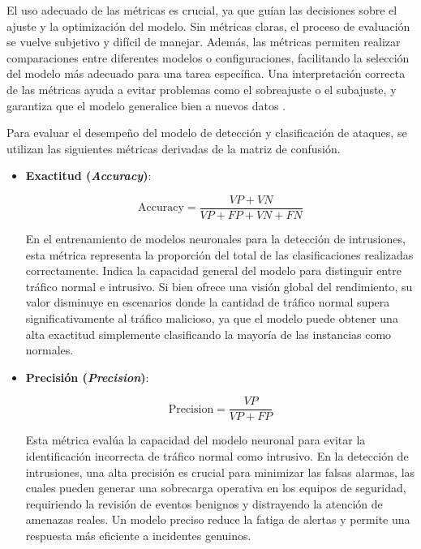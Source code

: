 El uso adecuado de las métricas es crucial, ya que guían las decisiones sobre el ajuste y la optimización del modelo. Sin métricas claras, el proceso de evaluación se vuelve subjetivo y difícil de manejar. Además, las métricas permiten realizar comparaciones entre diferentes modelos o configuraciones, facilitando la selección del modelo más adecuado para una tarea específica. Una interpretación correcta de las métricas ayuda a evitar problemas como el sobreajuste o el subajuste, y garantiza que el modelo generalice bien a nuevos datos \cite{goodfellow2016deep}.

Para evaluar el desempeño del modelo de detección y clasificación de ataques, se utilizan las siguientes métricas derivadas de la matriz de confusión.


\begin{itemize}
    \item \textbf{Exactitud (\textit{Accuracy})}: \label{met:Accuracy}
    
\begin{equation}
    \text{Accuracy} = \frac{VP + VN}{VP + FP + VN + FN}
\end{equation}

En el entrenamiento de modelos neuronales para la detección de intrusiones, esta métrica representa la proporción del total de las clasificaciones realizadas correctamente. Indica la capacidad general del modelo para distinguir entre tráfico normal e intrusivo. Si bien ofrece una visión global del rendimiento, su valor disminuye en escenarios donde la cantidad de tráfico normal supera significativamente al tráfico malicioso, ya que el modelo puede obtener una alta exactitud simplemente clasificando la mayoría de las instancias como normales.

\item \textbf{Precisión (\textit{Precision})}: \label{met:Precision}

\begin{equation}
    \text{Precision} = \frac{VP}{VP + FP}
\end{equation}

Esta métrica evalúa la capacidad del modelo neuronal para evitar la identificación incorrecta de tráfico normal como intrusivo. En la detección de intrusiones, una alta precisión es crucial para minimizar las falsas alarmas, las cuales pueden generar una sobrecarga operativa en los equipos de seguridad, requiriendo la revisión de eventos benignos y distrayendo la atención de amenazas reales. Un modelo preciso reduce la fatiga de alertas y permite una respuesta más eficiente a incidentes genuinos.


\end{itemize}
